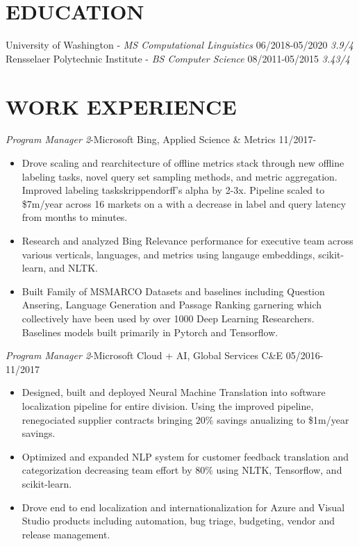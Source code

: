 \documentclass[line,margin]{res}
\begin{document}
\address{Seattle, WA (415)-272-9964 \href{mailto:dfcf93@hotmail.com}{dfcf93@hotmail.com}}
\begin{resume}
\section{EDUCATION}
University of Washington - {\sl MS Computational Linguistics} 06/2018-05/2020 {\sl 3.9/4} \\
Rensselaer Polytechnic Institute - {\sl BS Computer Science} 08/2011-05/2015  {\sl 3.43/4} \\      
\section{WORK EXPERIENCE} 
{\sl Program Manager 2}-Microsoft Bing, Applied Science \& Metrics  \hfill 11/2017-
\begin{itemize}  \itemsep -4pt 
\item Drove scaling and rearchitecture of offline metrics stack through new offline labeling tasks, novel query set sampling methods, and metric aggregation.  Improved labeling taskskrippendorff's alpha by 2-3x. Pipeline scaled to \$7m/year across 16 markets on a with a decrease in label and query latency from months to minutes.
\item Research and analyzed Bing Relevance performance for executive team across various verticals, languages, and metrics using langauge embeddings, scikit-learn, and NLTK.
\item  Built Family of MSMARCO Datasets and baselines including Question Ansering, Language Generation and Passage Ranking garnering which collectively have been used by over 1000 Deep Learning Researchers. Baselines models built primarily in Pytorch and Tensorflow.
\end{itemize}
{\sl Program Manager 2}-Microsoft Cloud + AI, Global Services C\&E \hfill 05/2016-11/2017
\begin{itemize}  \itemsep -4pt
\item Designed, built and deployed Neural Machine Translation into software localization pipeline for entire division. Using the improved pipeline, renegociated supplier contracts bringing $20\%$ savings anualizing to \$1m/year savings.
\item Optimized and expanded NLP system for customer feedback translation and categorization decreasing team effort by $80\%$ using NLTK, Tensorflow, and scikit-learn.
\item Drove end to end localization and internationalization for Azure and Visual Studio products including automation, bug triage, budgeting, vendor and release management.

\end{itemize}
\end{resume}
\end{document}
